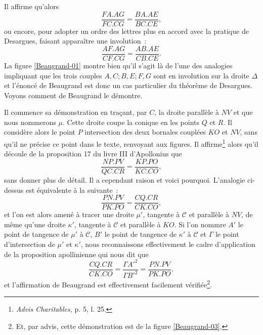 \documentclass[12pt, a4paper]{article}
\newcommand{\cC}{\mathcal{C}}
\begin{document}
Il affirme qu'alors
\[
\frac{FA.AG}{FC.CG}=\frac{BA.AE}{BC.CE},
\]
ou encore, pour adopter un ordre des lettres plus en accord avec la pratique de Desargues, faisant apparaître une involution~:~
\[
\frac{AF.AG}{CF.CG}=\frac{AB.AE}{CB.CE}.
\]
La figure \ref{Beaugrand-01} montre bien qu'il s'agit là de l'une des analogies impliquant que les trois couples $A,C;B,E;F,G$ sont en involution sur la droite $\Delta$ et l'énoncé de Beaugrand est donc un cas particulier du théorème de Desargues. Voyons comment de Beaugrand le démontre.

Il commence sa démonstration en traçant, par $C$, la droite parallèle à $NV$ et que nous nommerons $\mu$. Cette droite coupe la conique en les points $Q$ et $R$. Il considère alors le point $P$ intersection des deux bornales couplées $KO$ et $NV$, sans qu'il ne précise ce point dans le texte, renvoyant aux figures. Il affirme\footnote{\textit{Advis Charitables,} p. 5, l. 25.} alors qu'il découle de la proposition 17 du livre III d'Apollonius que
\[
\frac{NP.PV}{QC.CR}=\frac{KP.PO}{KC.CO},
\]
sans donner plus de détail. Il a cependant raison et voici pourquoi. L'analogie ci-dessus est équivalente à la suivante~:~
\[
\frac{PN.PV}{PK.PO}=\frac{CQ.CR}{CK.CO},
\]
et l'on est alors amené à tracer une droite $\mu'$, tangente à $\cC$ et parallèle à $NV$, de même qu'une droite $\kappa'$, tangente à $\cC$ et parallèle à $KO$. Si l'on nommre $A'$ le point de tangence de $\mu'$ à $\cC$, $B'$ le point de tangence de $\kappa'$ à $\cC$ et $\Gamma$ le point d'intersection de $\mu'$ et $\kappa'$, nous reconnaissons effectivement le cadre d'application de la proposition apollinienne qui nous dit que
\[
\frac{CQ.CR}{CK.CO}=\frac{\Gamma A'^2}{\Gamma B'^2}=\frac{PN.PV}{PK.PO},
\]
et l'affirmation de Beaugrand est effectivement facilement vérifiée\footnote{Et, par advis, cette démonstration est de la figure \ref{Beaugrand-03}.}. 
\end{document}
